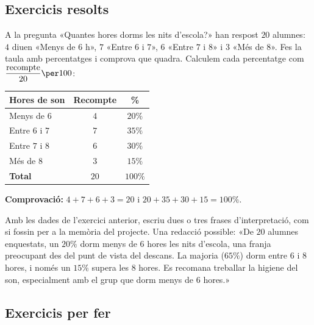 \subsection{Exercicis resolts}

\begin{exresolt}
A la pregunta «Quantes hores dorms les nits d'escola?» han respost $20$ alumnes:
$4$ diuen «Menys de $6$ h», $7$ «Entre $6$ i $7$», $6$ «Entre $7$ i $8$» i $3$ «Més
de $8$». Fes la taula amb percentatges i comprova que quadra.
\solucio
Calculem cada percentatge com $\dfrac{\text{recompte}}{20}\per 100$:

\begin{center}
\begin{tabular}{l c c}
\toprule
\textbf{Hores de son} & \textbf{Recompte} & \textbf{\%} \\
\midrule
Menys de $6$ & $4$ & $20\%$ \\
Entre $6$ i $7$ & $7$ & $35\%$ \\
Entre $7$ i $8$ & $6$ & $30\%$ \\
Més de $8$ & $3$ & $15\%$ \\
\midrule
\textbf{Total} & $20$ & $100\%$ \\
\bottomrule
\end{tabular}
\end{center}
\textbf{Comprovació:} $4+7+6+3=20$ i $20+35+30+15=100\%$.
\end{exresolt}

\begin{exresolt}
Amb les dades de l'exercici anterior, escriu dues o tres frases d'interpretació, com
si fossin per a la memòria del projecte.
\solucio
Una redacció possible: «De $20$ alumnes enquestats, un $20\%$ dorm menys de $6$ hores
les nits d'escola, una franja preocupant des del punt de vista del descans. La majoria
($65\%$) dorm entre $6$ i $8$ hores, i només un $15\%$ supera les $8$ hores. Es
recomana treballar la higiene del son, especialment amb el grup que dorm menys de $6$
hores.»
\end{exresolt}

\subsection{Exercicis per fer}

